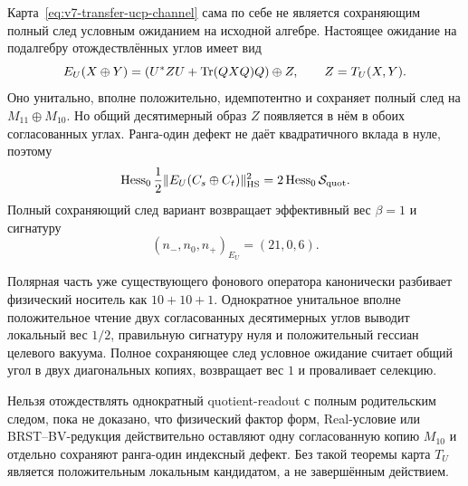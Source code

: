 Карта~\eqref{eq:v7-transfer-ucp-channel} сама по себе не является
сохраняющим полный след условным ожиданием на исходной алгебре. Настоящее
ожидание на подалгебру отождествлённых углов имеет вид
\begin{equation}
 E_U(X\oplus Y)
 =\left(U^*ZU+\operatorname{Tr}(QXQ)Q\right)\oplus Z,
 \qquad
 Z=T_U(X,Y).
 \label{eq:v7-transfer-trace-preserving-expectation}
\end{equation}
Оно унитально, вполне положительно, идемпотентно и сохраняет полный след на
$M_{11}\oplus M_{10}$. Но общий десятимерный образ $Z$ появляется в нём в
обоих согласованных углах. Ранга-один дефект не даёт квадратичного вклада в
нуле, поэтому
\begin{equation}
 \operatorname{Hess}_0\frac12\|E_U(C_s\oplus C_t)\|_{\rm HS}^2
 =2\operatorname{Hess}_0\mathcal S_{\rm quot}.
 \label{eq:v7-transfer-expectation-double-count}
\end{equation}
Полный сохраняющий след вариант возвращает эффективный вес $\beta=1$ и
сигнатуру
\begin{equation}
 (n_-,n_0,n_+)_{E_U}=(21,0,6).
 \label{eq:v7-transfer-expectation-no-go}
\end{equation}

\begin{theorem}
Полярная часть уже существующего фонового оператора канонически разбивает
физический носитель как $10+10+1$. Однократное унитальное вполне
положительное чтение двух согласованных десятимерных углов выводит локальный
вес $1/2$, правильную сигнатуру нуля и положительный гессиан целевого
вакуума. Полное сохраняющее след условное ожидание считает общий угол в двух
диагональных копиях, возвращает вес $1$ и проваливает селекцию.
\end{theorem}

\begin{nogocriterion}
Нельзя отождествлять однократный quotient-readout с полным родительским
следом, пока не доказано, что физический фактор форм, Real-условие или
BRST--BV-редукция действительно оставляют одну согласованную копию
$M_{10}$ и отдельно сохраняют ранга-один индексный дефект. Без такой
теоремы карта $T_U$ является положительным локальным кандидатом, а не
завершённым действием.
\end{nogocriterion}

